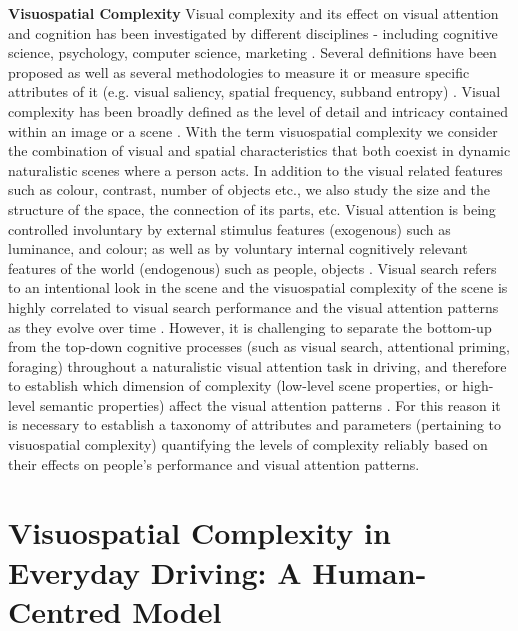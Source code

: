 \documentclass[a4paper]{article}
\begin{document}
 \textbf{\sffamily Visuospatial Complexity} \quad    Visual complexity and its effect on visual attention and cognition has been investigated by different disciplines - including cognitive science, psychology, computer science, marketing \cite{Cavalcante2014}. Several definitions have been proposed as well as several methodologies to measure it or measure specific attributes of it (e.g. visual saliency, spatial frequency, subband entropy) \cite{Henderson2009, Madan2018, Rosenholtz2007}. Visual complexity has been broadly defined as the level of detail and intricacy contained within an image or a scene \cite{Snodgrass1980}. With the term visuospatial complexity we consider the combination of visual and spatial characteristics that both coexist in dynamic naturalistic scenes where a person acts. In addition to the visual related features such as colour, contrast, number of objects etc., we also study the size and the structure of the space, the connection of its parts, etc.  Visual attention is being controlled involuntary by external stimulus features (exogenous) such as luminance, and colour; as well as by voluntary internal cognitively relevant features of the world (endogenous) such as people, objects \cite{Carrasco2011}.  Visual search refers to an intentional look in the scene and the visuospatial complexity of the scene is highly correlated to visual search performance and the visual attention patterns as they evolve over time \cite{Eckstein2011}. However,  it is challenging to separate the bottom-up from the top-down cognitive processes (such as visual search, attentional priming, foraging) throughout a naturalistic visual attention task in driving, and therefore to establish which dimension of complexity (low-level scene properties, or high-level semantic properties) affect the visual attention patterns \cite{Schutt2019, Awh2012, Williams2019, Kristjansson2020, Kristjansson2019}. For this reason it is necessary to establish a taxonomy of attributes and parameters (pertaining to visuospatial complexity) quantifying the levels of complexity reliably based on their effects on people's performance and visual attention patterns.




\section{\sffamily Visuospatial Complexity in Everyday Driving: A Human-Centred Model} 
\end{document}
